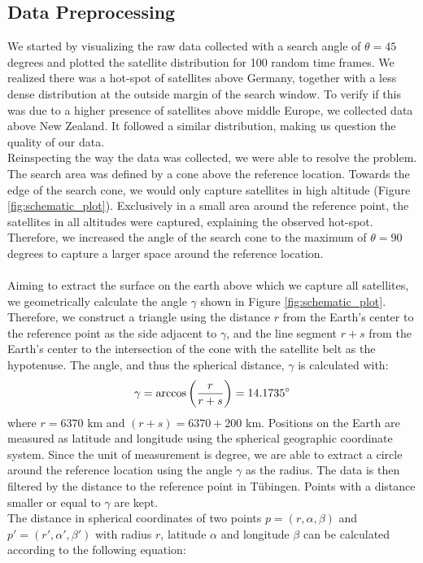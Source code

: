 \documentclass{article}
\theoremstyle{plain}
\theoremstyle{definition}
\theoremstyle{remark}
\begin{document}
\subsection{Data Preprocessing}
We started by visualizing the raw data collected with a search angle of $\theta=45$ degrees and plotted the satellite distribution for 100 random time frames. 
We realized there was a hot-spot of satellites above Germany, together with a less dense distribution at the outside margin of the search window. 
To verify if this was due to a higher presence of satellites above middle Europe, we collected data above New Zealand. It followed a similar distribution, making us question the quality of our data. \\
Reinspecting the way the data was collected, we were able to resolve the problem. The search area was defined by a cone above the reference location. Towards the edge of the search cone, we would only capture satellites in high altitude (Figure \ref{fig:schematic_plot}).  
Exclusively in a small area around the reference point, the satellites in all altitudes were captured, explaining the observed hot-spot. Therefore, we increased the angle of the search cone to the maximum of $\theta=90$ degrees to capture a larger space around the reference location.\\\\ 
Aiming to extract the surface on the earth above which we capture all satellites, we geometrically calculate the angle $\gamma$ shown in Figure \ref{fig:schematic_plot}.
Therefore, we construct a triangle using the distance $r$ from the Earth's center to the reference point as the side adjacent to $\gamma$, and the line segment $r+s$ from the Earth's center to the intersection of the cone with the satellite belt as the hypotenuse. 
The angle, and thus the spherical distance, $\gamma$ is calculated with:
\begin{equation}{\label{eq:gamma}}
    \gamma = \arccos{\left( \frac{r}{r + s} \right)} =  14.1735^\circ
\end{equation}
where $r=6370$ km and $(r+s)=6370+200$ km.
Positions on the Earth are measured as latitude and longitude using the spherical geographic coordinate system. Since the unit of measurement is degree, we are able to extract a circle around the reference location using the angle $\gamma$ as the radius. 
The data is then filtered by the distance to the reference point in Tübingen. Points with a distance smaller or equal to $\gamma$ are kept.\\
The distance in spherical coordinates of two points $p=(r,\alpha,\beta)$ and $p'=(r',\alpha',\beta')$ with radius $r$, latitude $\alpha$ and longitude $\beta$ can be calculated according to the following equation:
\end{document}
